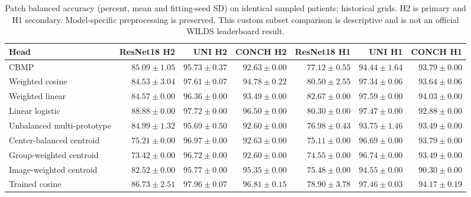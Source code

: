 \begin{table}[p]
\centering\small
\setlength{\tabcolsep}{3pt}
\begin{tabular}{lrrrrrr}
\hline
Head & ResNet18 H2 & UNI H2 & CONCH H2 & ResNet18 H1 & UNI H1 & CONCH H1 \\
\hline
CBMP & $85.09\pm1.05$ & $95.73\pm0.37$ & $92.63\pm0.00$ & $77.12\pm0.55$ & $94.44\pm1.64$ & $93.79\pm0.00$ \\
Weighted cosine & $84.53\pm3.04$ & $97.61\pm0.07$ & $94.78\pm0.22$ & $80.50\pm2.55$ & $97.34\pm0.06$ & $93.64\pm0.06$ \\
Weighted linear & $84.57\pm0.00$ & $96.36\pm0.00$ & $93.49\pm0.00$ & $82.67\pm0.00$ & $97.59\pm0.00$ & $94.03\pm0.00$ \\
Linear logistic & $88.88\pm0.00$ & $97.72\pm0.00$ & $96.50\pm0.00$ & $80.30\pm0.00$ & $97.47\pm0.00$ & $92.88\pm0.00$ \\
Unbalanced multi-prototype & $84.99\pm1.32$ & $95.69\pm0.50$ & $92.60\pm0.00$ & $76.98\pm0.43$ & $93.75\pm1.46$ & $93.49\pm0.00$ \\
Center-balanced centroid & $75.21\pm0.00$ & $96.97\pm0.00$ & $92.63\pm0.00$ & $75.11\pm0.00$ & $96.69\pm0.00$ & $93.79\pm0.00$ \\
Group-weighted centroid & $73.42\pm0.00$ & $96.72\pm0.00$ & $92.60\pm0.00$ & $74.55\pm0.00$ & $96.74\pm0.00$ & $93.49\pm0.00$ \\
Image-weighted centroid & $82.52\pm0.00$ & $95.77\pm0.00$ & $95.35\pm0.00$ & $75.48\pm0.00$ & $94.55\pm0.00$ & $90.30\pm0.00$ \\
Trained cosine & $86.73\pm2.51$ & $97.96\pm0.07$ & $96.81\pm0.15$ & $78.90\pm3.78$ & $97.46\pm0.03$ & $94.17\pm0.19$ \\
\hline
\end{tabular}
\caption{Patch balanced accuracy (percent, mean and fitting-seed SD) on identical sampled patients; historical grids. H2 is primary and H1 secondary. Model-specific preprocessing is preserved. This custom subset comparison is descriptive and is not an official WILDS leaderboard result.}
\label{tab:supp_historical_balanced_accuracy}
\end{table}

